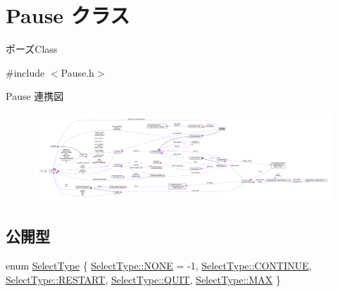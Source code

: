 \hypertarget{class_pause}{}\section{Pause クラス}
\label{class_pause}


ポーズ\+Class  




{\ttfamily \#include $<$Pause.\+h$>$}



Pause 連携図\nopagebreak
\begin{figure}[H]
\begin{center}
\leavevmode
\includegraphics[width=350pt]{class_pause__coll__graph}
\end{center}
\end{figure}
\subsection*{公開型}
\begin{DoxyCompactItemize}
\item 
enum \mbox{\hyperlink{class_pause_a13a552c560a41cf0b17cbef35f8fece7}{Select\+Type}} \{ \newline
\mbox{\hyperlink{class_pause_a13a552c560a41cf0b17cbef35f8fece7ab50339a10e1de285ac99d4c3990b8693}{Select\+Type\+::\+N\+O\+NE}} = -\/1, 
\mbox{\hyperlink{class_pause_a13a552c560a41cf0b17cbef35f8fece7a2f453cfe638e57e27bb0c9512436111e}{Select\+Type\+::\+C\+O\+N\+T\+I\+N\+UE}}, 
\mbox{\hyperlink{class_pause_a13a552c560a41cf0b17cbef35f8fece7a1104c54a9ec6549e4ef9562b687596fb}{Select\+Type\+::\+R\+E\+S\+T\+A\+RT}}, 
\mbox{\hyperlink{class_pause_a13a552c560a41cf0b17cbef35f8fece7a5dfd352dd6b7a5d118237fcf1e19fcc1}{Select\+Type\+::\+Q\+U\+IT}}, 
\newline
\mbox{\hyperlink{class_pause_a13a552c560a41cf0b17cbef35f8fece7a26a4b44a837bf97b972628509912b4a5}{Select\+Type\+::\+M\+AX}}
 \}
\end{DoxyCompactItemize}

